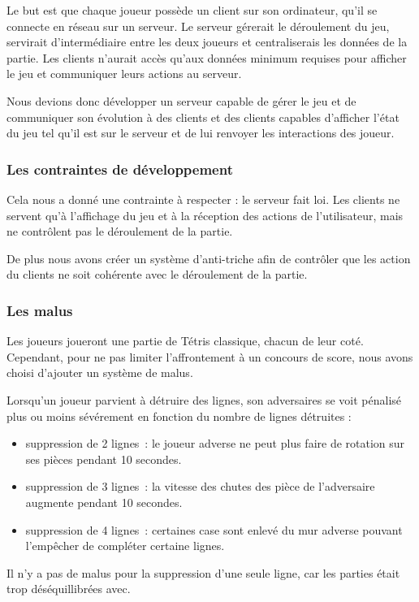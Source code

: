 \documentclass[a4paper, 12pt]{article}
\begin{document}
			Le but est que chaque joueur possède un client sur son ordinateur, qu'il se connecte en réseau sur un serveur. Le serveur gérerait le déroulement du jeu, servirait d'intermédiaire entre les deux joueurs et centraliserais les données de la partie.
			Les clients n'aurait accès qu'aux données minimum requises pour afficher le jeu et communiquer leurs actions au serveur. 


			Nous devions donc développer un serveur capable de gérer le jeu et de communiquer son évolution à des clients et des clients capables d'afficher l'état du jeu tel qu'il est sur le serveur et de lui renvoyer les interactions des joueur.


		\subsubsection{Les contraintes de développement}
			Cela nous a donné une contrainte à respecter : le serveur fait loi. Les clients ne servent qu'à l'affichage du jeu et à la réception des actions de l'utilisateur, mais ne contrôlent pas le déroulement de la partie.

			De plus nous avons créer un système d'anti-triche afin de contrôler que les action du clients ne soit cohérente avec le déroulement de la partie.

		\subsubsection{Les malus}
			Les joueurs joueront une partie de Tétris classique, chacun de leur coté. Cependant, pour ne pas limiter l'affrontement à un concours de score, nous avons choisi d'ajouter un système de malus.

			Lorsqu'un joueur parvient à détruire des lignes, son adversaires se voit pénalisé plus ou moins sévérement en fonction du nombre de lignes détruites :
			\begin{itemize}
				\item suppression de 2 lignes : le joueur adverse ne peut plus faire de rotation sur ses pièces pendant 10 secondes.
				\item suppression de 3 lignes : la vitesse des chutes des pièce de l’adversaire augmente pendant 10 secondes.
				\item suppression de 4 lignes : certaines case sont enlevé du mur adverse pouvant l’empêcher de compléter certaine lignes.
			\end{itemize}

			Il n'y a pas de malus pour la suppression d'une seule ligne, car les parties était trop déséquillibrées avec.
\end{document}
